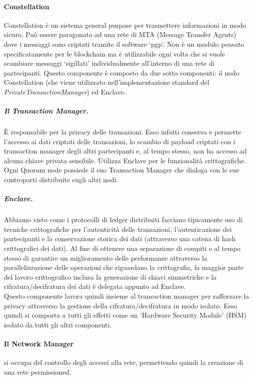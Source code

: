 \paragraph{Constellation}
%
Constellation è un sistema general purpose per trasmettere informazioni in modo sicuro. Può essere paragonato ad una rete di MTA (Message Transfer Agents) dove i messaggi sono criptati tramite il software \enquote*{\gls{pgp}}. Non è un modulo pensato specificatamente per le blockchain ma è utilizzabile ogni volta che si vuole scambiare messaggi \enquote*{sigillati} individualmente all'interno di una rete di partecipanti. Questo componente è composto da due sotto componenti: il nodo Constellation (che viene utilizzato nell'implementazione standard del \emph{PrivateTransactionManager}) ed Enclave.%
\subparagraph{Il Transaction Manager.} È responsabile per la privacy delle transazioni. Esso infatti conserva e permette l'accesso ai dati criptati delle transazioni, lo scambio di payload criptati con i transaction manager degli altri partecipanti e, al tempo stesso, non ha accesso ad alcuna chiave privata sensibile. Utilizza Enclave per le funzionalità crittografiche. Ogni Quorum node possiede il suo Transaction Manager che dialoga con le sue controparti distribuite sugli altri nodi.%
\subparagraph{Enclave.} Abbiamo visto come i protocolli di ledger distribuiti facciano tipicamente uso di tecniche crittografiche per l'autenticità delle transazioni, l'autenticazione dei partecipanti e la conservazione storica dei dati (attraverso una catena di hash crittografici dei dati). Al fine di ottenere una separazione di compiti e al tempo stesso di garantire un miglioramento delle performanze attraverso la parallelizzazione delle operazioni che riguardano la crittografia, la maggior parte del lavoro crittografico inclusa la generazione di chiavi simmetriche e la cifratura/decifratura dei dati è delegata appunto ad Enclave. \\ Questo componente lavora quindi insieme al transaction manager per rafforzare la privacy attraverso la gestione della cifratura/decifratura in modo isolato. Esso quindi si comporta a tutti gli effetti come un \enquote*{Hardware Security Module} (HSM) isolato da tutti gli altri componenti.
%
\paragraph{Il Network Manager} si occupa del controllo degli accessi alla rete, permettendo quindi la creazione di una rete permissioned. %
%

